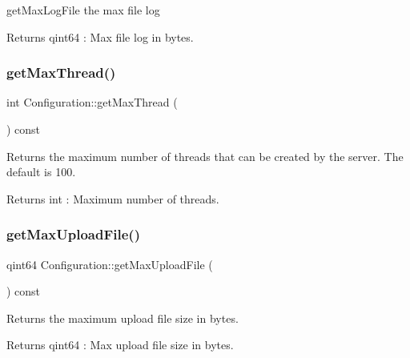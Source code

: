 get\+Max\+Log\+File the max file log 

\begin{DoxyReturn}{Returns}
qint64 \+: Max file log in bytes. 
\end{DoxyReturn}
\mbox{\label{class_configuration_ad0e836129d0a7e0111b1f2c092729939}} 
\subsubsection{\texorpdfstring{get\+Max\+Thread()}{getMaxThread()}}
{\footnotesize\ttfamily int Configuration\+::get\+Max\+Thread (\begin{DoxyParamCaption}{ }\end{DoxyParamCaption}) const}



Returns the maximum number of threads that can be created by the server. The default is 100. 

\begin{DoxyReturn}{Returns}
int \+: Maximum number of threads. 
\end{DoxyReturn}
\mbox{\label{class_configuration_a8bc88e3cfe151837ee77e213e441953e}} 
\subsubsection{\texorpdfstring{get\+Max\+Upload\+File()}{getMaxUploadFile()}}
{\footnotesize\ttfamily qint64 Configuration\+::get\+Max\+Upload\+File (\begin{DoxyParamCaption}{ }\end{DoxyParamCaption}) const}



Returns the maximum upload file size in bytes. 

\begin{DoxyReturn}{Returns}
qint64 \+: Max upload file size in bytes. 
\end{DoxyReturn}
\mbox{\label{class_configuration_a43acf80f787217903281b0a6d3e01e11}} 

